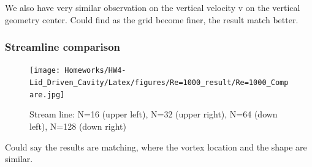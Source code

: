 \documentclass[12pt]{article}
\begin{document}
We also have very similar observation on the vertical velocity v on the vertical geometry center. Could find as the grid become finer, the result match better.


\subsubsection{Streamline comparison}
\begin{figure}[H]
    \centering
    \texttt{[image: Homeworks/HW4-Lid\_Driven\_Cavity/Latex/figures/Re=1000\_result/Re=1000\_Compare.jpg]}
    \caption{Stream line: N=16 (upper left), N=32 (upper right), 
    N=64 (down left), N=128 (down right)}
\end{figure}

Could say the results are matching, where the vortex location and the shape are similar.


















\end{document}
